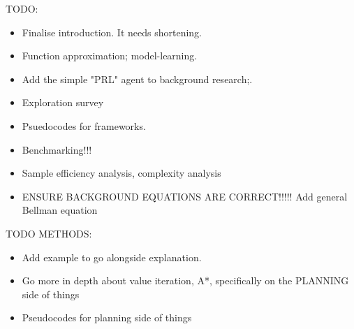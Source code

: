 TODO:
\begin{itemize}
    \item Finalise introduction. It needs shortening.
    \item Function approximation; model-learning.
    \item Add the simple "PRL" agent to background research;.
    \item Exploration survey
    \item Psuedocodes for frameworks.
    \item Benchmarking!!!
    \item Sample efficiency analysis, complexity analysis
    \item ENSURE BACKGROUND EQUATIONS ARE CORRECT!!!!! Add general Bellman equation
\end{itemize}


TODO METHODS:
\begin{itemize}
    \item Add example to go alongside explanation.
    \item Go more in depth about value iteration, A*, specifically on the PLANNING side of things
    \item Pseudocodes for planning side of things
    
\end{itemize}